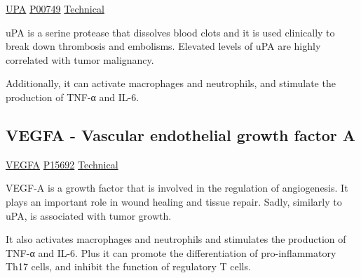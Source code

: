 \href{https://en.wikipedia.org/wiki/Urokinase}{UPA}
\href{http://www.uniprot.org/uniprot/P00749}{P00749}
\href{https://olink.com/products-services/target/protein/?assayID=5072}{Technical}

uPA is a serine protease that dissolves blood clots and it is used clinically to break down thrombosis and embolisms. Elevated levels of uPA are highly correlated with tumor malignancy. 

Additionally, it can activate macrophages and neutrophils, and stimulate the production of TNF-α and IL-6.

\subsection{VEGFA - Vascular endothelial growth factor A}

\href{https://en.wikipedia.org/wiki/Vascular \textunderscore endothelial \textunderscore growth \textunderscore factor}{VEGFA}
\href{http://www.uniprot.org/uniprot/P15692}{P15692}
\href{https://olink.com/products-services/target/protein/?assayID=5064}{Technical}
        
VEGF-A is a growth factor that is involved in the regulation of angiogenesis. It plays an important role in wound healing and tissue repair. Sadly, similarly to uPA, is associated with tumor growth.

It also activates macrophages and neutrophils and stimulates the production of TNF-α and IL-6. Plus it can promote the differentiation of pro-inflammatory Th17 cells, and inhibit the function of regulatory T cells.
